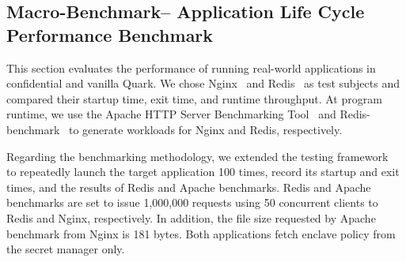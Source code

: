 










\subsection{Macro-Benchmark– Application Life Cycle Performance Benchmark}\label{macri_app_start_up}

This section evaluates the performance of running real-world applications in confidential and vanilla Quark. We chose Nginx~\cite*{nginx} and Redis~\cite*{redis} as test subjects and compared their startup time, exit time, and runtime throughput. At program runtime, we use the Apache HTTP Server 
Benchmarking Tool~\cite*{ab} and Redis-benchmark~\cite*{Redis_benchmark} to generate workloads for Nginx and Redis, respectively.

Regarding the benchmarking methodology, we extended the testing framework~\cite*{benchamark_framework} to repeatedly launch the target application 100 times, record its startup and exit times, and the results of Redis and Apache benchmarks. Redis and Apache benchmarks are set to issue 1,000,000 
requests using 50 concurrent clients to Redis and Nginx, respectively. In addition, the file size requested by Apache benchmark from Nginx is 181 bytes. Both applications fetch enclave policy from the secret manager only.


